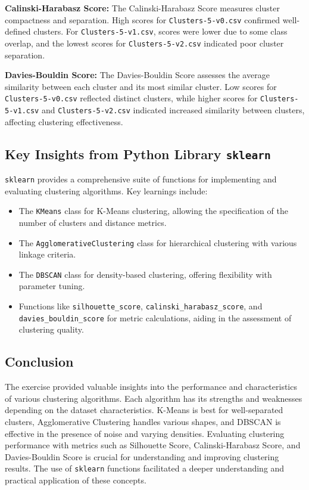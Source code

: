 \textbf{Calinski-Harabasz Score:}
The Calinski-Harabasz Score measures cluster compactness and separation. High scores for \texttt{Clusters-5-v0.csv} confirmed well-defined clusters. For \texttt{Clusters-5-v1.csv}, scores were lower due to some class overlap, and the lowest scores for \texttt{Clusters-5-v2.csv} indicated poor cluster separation.

\textbf{Davies-Bouldin Score:}
The Davies-Bouldin Score assesses the average similarity between each cluster and its most similar cluster. Low scores for \texttt{Clusters-5-v0.csv} reflected distinct clusters, while higher scores for \texttt{Clusters-5-v1.csv} and \texttt{Clusters-5-v2.csv} indicated increased similarity between clusters, affecting clustering effectiveness.

\subsection*{Key Insights from Python Library \texttt{sklearn}}

\texttt{sklearn} provides a comprehensive suite of functions for implementing and evaluating clustering algorithms. Key learnings include:

\begin{itemize}
    \item The \texttt{KMeans} class for K-Means clustering, allowing the specification of the number of clusters and distance metrics.
    \item The \texttt{AgglomerativeClustering} class for hierarchical clustering with various linkage criteria.
    \item The \texttt{DBSCAN} class for density-based clustering, offering flexibility with parameter tuning.
    \item Functions like \texttt{silhouette\_score}, \texttt{calinski\_harabasz\_score}, and \texttt{davies\_bouldin\_score} for metric calculations, aiding in the assessment of clustering quality.
\end{itemize}

\subsection*{Conclusion}
The exercise provided valuable insights into the performance and characteristics of various clustering algorithms. Each algorithm has its strengths and weaknesses depending on the dataset characteristics. K-Means is best for well-separated clusters, Agglomerative Clustering handles various shapes, and DBSCAN is effective in the presence of noise and varying densities. Evaluating clustering performance with metrics such as Silhouette Score, Calinski-Harabasz Score, and Davies-Bouldin Score is crucial for understanding and improving clustering results. The use of \texttt{sklearn} functions facilitated a deeper understanding and practical application of these concepts.


\clearpage